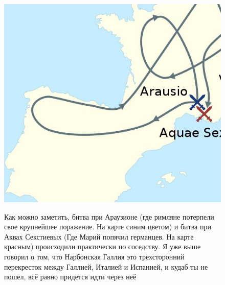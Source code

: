 \begin{figure}[h!tb]
	\centering\includegraphics[scale=0.6]{kimres/1574758535182364019.png}
	\label{fig:kimr3} %
	\caption{Как можно заметить, битва при Араузионе (где римляне потерпели свое крупнейшее поражение. На карте синим цветом) и битва при Аквах Секстиевых (Где Марий попячил германцев. На карте красным) происходили практически по соседству. Я уже выше говорил о том, что Нарбонская Галлия это трехсторонний перекресток между Галлией, Италией и Испанией, и кудаб ты не пошел, всё равно придется идти через неё}
\end{figure}


